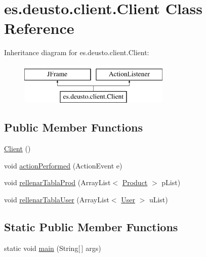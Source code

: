 \hypertarget{classes_1_1deusto_1_1client_1_1_client}{}\section{es.\+deusto.\+client.\+Client Class Reference}
\label{classes_1_1deusto_1_1client_1_1_client}
Inheritance diagram for es.\+deusto.\+client.\+Client\+:\begin{figure}[H]
\begin{center}
\leavevmode
\includegraphics[height=2.000000cm]{classes_1_1deusto_1_1client_1_1_client}
\end{center}
\end{figure}
\subsection*{Public Member Functions}
\begin{DoxyCompactItemize}
\item 
\hyperlink{classes_1_1deusto_1_1client_1_1_client_a71c03e318a72447da873297f3364f67f}{Client} ()
\item 
void \hyperlink{classes_1_1deusto_1_1client_1_1_client_a57eb7a5154b4b1559430f90a1c1df852}{action\+Performed} (Action\+Event e)
\item 
void \hyperlink{classes_1_1deusto_1_1client_1_1_client_a141b9b15a5ba7dc5b3daf2032529575f}{rellenar\+Tabla\+Prod} (Array\+List$<$ \hyperlink{classes_1_1deusto_1_1server_1_1db_1_1data_1_1_product}{Product} $>$ p\+List)
\item 
void \hyperlink{classes_1_1deusto_1_1client_1_1_client_a8c6076e43a37a66a27a00f458eeab3de}{rellenar\+Tabla\+User} (Array\+List$<$ \hyperlink{classes_1_1deusto_1_1server_1_1db_1_1data_1_1_user}{User} $>$ u\+List)
\end{DoxyCompactItemize}
\subsection*{Static Public Member Functions}
\begin{DoxyCompactItemize}
\item 
static void \hyperlink{classes_1_1deusto_1_1client_1_1_client_a69a7526d0af9cb2341f4bf341b501152}{main} (String\mbox{[}$\,$\mbox{]} args)
\end{DoxyCompactItemize}


